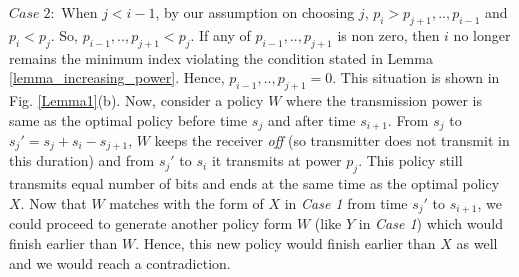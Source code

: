 $Case\;2:$ When $j<i-1$, by our assumption on choosing $j$, $p_i>p_{j+1},..,p_{i-1}$ and $p_i<p_{j}$. So, $p_{i-1},..,p_{j+1}<p_j$. If any of $p_{i-1},..,p_{j+1}$ is non zero, then $i$ no longer remains the minimum index violating the condition stated in Lemma \ref{lemma_increasing_power}. Hence, $p_{i-1},..,p_{j+1}=0$. This situation is shown in Fig. \ref{Lemma1}(b). Now, consider a policy $W$ where the transmission power is same as the optimal policy before time $s_j$ and after time $s_{i+1}$. From $s_j$ to $s_j'=s_j+s_{i}-s_{j+1}$, $W$ keeps the receiver \textit{off} (so transmitter does not transmit in this duration) and from $s_j'$ to $s_{i}$ it transmits at power $p_j$. This policy still transmits equal number of bits and ends at the same time as the optimal policy $X$. Now that $W$ matches with the form of $X$ in \textit{Case 1} from time $s_j'$ to $s_{i+1}$, we could proceed to generate another policy form $W$ (like $Y$ in \textit{Case 1}) which would finish earlier than $W$. Hence, this new policy would finish earlier than $X$ as well and we would reach a contradiction. 
